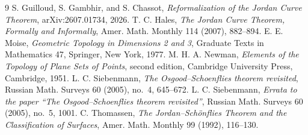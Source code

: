 \documentclass[11pt]{article}
\theoremstyle{mainplain}
\theoremstyle{mainroman}
\theoremstyle{definition}
\numberwithin{equation}{section}
\begin{document}
\begin{thebibliography}{9}
S. Guilloud, S. Gambhir, and S. Chassot, \emph{Reformalization of the Jordan Curve Theorem}, arXiv:2607.01734, 2026.
T. C. Hales, \emph{The Jordan Curve Theorem, Formally and Informally}, Amer. Math. Monthly 114 (2007), 882--894.
E. E. Moise, \emph{Geometric Topology in Dimensions 2 and 3}, Graduate Texts in Mathematics 47, Springer, New York, 1977.
M. H. A. Newman, \emph{Elements of the Topology of Plane Sets of Points}, second edition, Cambridge University Press, Cambridge, 1951.
L. C. Siebenmann, \emph{The Osgood--Schoenflies theorem revisited}, Russian Math. Surveys 60 (2005), no.~4, 645--672.
L. C. Siebenmann, \emph{Errata to the paper ``The Osgood--Schoenflies theorem revisited''}, Russian Math. Surveys 60 (2005), no.~5, 1001.
C. Thomassen, \emph{The Jordan--Schönflies Theorem and the Classification of Surfaces}, Amer. Math. Monthly 99 (1992), 116--130.
\end{thebibliography}
\end{document}
